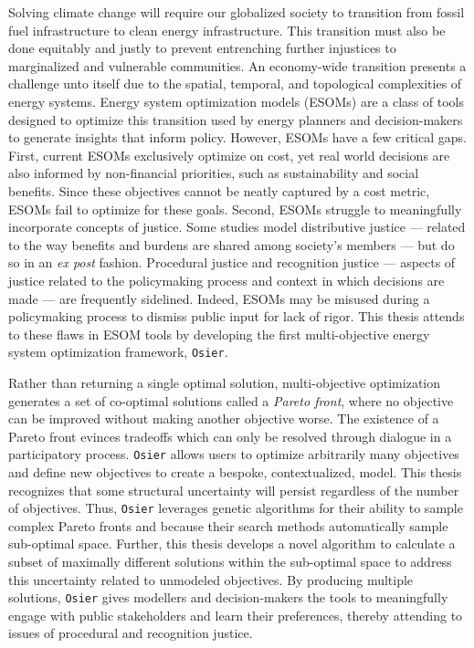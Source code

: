Solving climate change will require our globalized society to transition from
fossil fuel infrastructure to clean energy infrastructure. This transition must
also be done equitably and justly to prevent entrenching further injustices to
marginalized and vulnerable communities. An economy-wide transition presents a
challenge unto itself due to the spatial, temporal, and topological complexities
of energy systems. Energy system optimization models (ESOMs) are a class of
tools designed to optimize this transition used by energy planners and
decision-makers to generate insights that inform policy. However, ESOMs have a
few critical gaps. First, current ESOMs exclusively optimize on cost, yet real
world decisions are also informed by non-financial priorities, such as
sustainability and social benefits. Since these objectives cannot be neatly
captured by a cost metric, ESOMs fail to optimize for these goals. Second, ESOMs
struggle to meaningfully incorporate concepts of justice. Some studies model
distributive justice --- related to the way benefits and burdens are shared
among society's members --- but do so in an \textit{ex post} fashion. Procedural
justice and recognition justice --- aspects of justice related to the
policymaking process and context in which decisions are made --- are frequently
sidelined. Indeed, ESOMs may be misused during a policymaking process to dismiss
public input for lack of rigor. This thesis attends to these flaws in ESOM tools
by developing the first multi-objective energy system optimization framework,
\texttt{Osier}.

Rather than returning a single optimal solution, multi-objective optimization
generates a set of co-optimal solutions called a \textit{Pareto front}, where no
objective can be improved without making another objective worse. The existence
of a Pareto front evinces tradeoffs which can only be resolved through dialogue
in a participatory process. \texttt{Osier} allows users to optimize arbitrarily
many objectives and define new objectives to create a bespoke, contextualized,
model. This thesis recognizes that some structural uncertainty will persist
regardless of the number of objectives. Thus, \texttt{Osier} leverages genetic
algorithms for their ability to sample complex Pareto fronts and because their
search methods automatically sample sub-optimal space. Further, this thesis
develops a novel algorithm to calculate a subset of maximally different
solutions within the sub-optimal space to address this uncertainty related to
unmodeled objectives. By producing multiple solutions, \texttt{Osier} gives
modellers and decision-makers the tools to meaningfully engage with public
stakeholders and learn their preferences, thereby attending to issues of
procedural and recognition justice.


